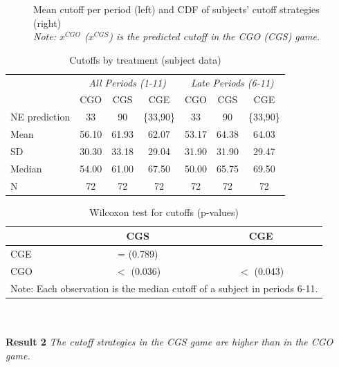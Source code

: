 \documentclass[12pt, letterpaper]{article}
\theoremstyle{plain}
\begin{document}
\begin{center}
\begin{figure}[ht]
\begin{minipage}[t]{0.45\columnwidth}
\end{minipage} 
\caption{Mean cutoff per period (left) and CDF of subjects' cutoff strategies (right) \\\footnotesize{\textit{Note: $x^{CGO}$ ($x^{CGS}$) is the predicted cutoff in the CGO (CGS) game.}} }
\label{fig:allcutoff}\end{figure}
\par\end{center}

\begin{table}[!ht]
\centering\caption{Cutoffs by treatment (subject data)}

\begin{tabular}{lccc|ccc}
\hline
& \multicolumn{3}{c}{\textit{All Periods (1-11)}} & \multicolumn{3}{c}{\textit{Late Periods (6-11)}}\\
 & CGO & CGS  & CGE  & CGO & CGS  & CGE\\
  \hline
  NE prediction & 33 & 90 & \{33,90\} & 33 & 90 & \{33,90\}\\
  Mean & 56.10 & 61.93 & 62.07 &  53.17 &  64.38 & 64.03 \\
  SD & 30.30 & 33.18 & 29.04 &  31.90 &  31.90 & 29.47 \\
  Median & 54.00 & 61.00 & 67.50 &  50.00 &  65.75 & 69.50 \\
    N & 72 &  72 & 72 & 72 &  72 & 72 \\
\hline
\end{tabular}

\label{tab(cutoffs)}
\end{table}
\begin{table}[ht]
\centering\caption{ Wilcoxon test for cutoffs (p-values)}

\begin{tabular}{l|cc}
& CGS & CGE \\
\hline
CGE & = (0.789)& \\
CGO & $<$ (0.036) & $<$ (0.043)\\
\hline
 \multicolumn{3}{p{.35\textwidth}}{\scriptsize{Note: Each observation is the median cutoff of a subject in periods 6-11.}}\\ 
\end{tabular}

\label{tab(cutoff-pvalue)}
\end{table}
\\
\\
\noindent \textbf{Result 2}
\textit{The cutoff strategies in the CGS game are higher than in the CGO game.}\\
\end{document}
